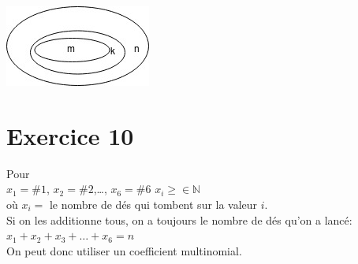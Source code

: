 \documentclass[fontsize=10pt]{article}
\begin{document}
\includegraphics[scale=1]{TP6Exo9.jpg} 

\section*{Exercice 10}
Pour\\$x_1 = \#1$, $x_2 = \#2$,\dots, $x_6 = \#6$ \hspace{1cm} $x_i \geq \in \mathbb{N}$ \\
où $x_i =$ le nombre de dés qui tombent sur la valeur $i$.\\
Si on les additionne tous, on a toujours le nombre de dés qu'on a lancé:\\
$x_1 + x_2 +x_3 + \dots + x_6 =n$\\
On peut donc utiliser un coefficient multinomial.
\end{document}
